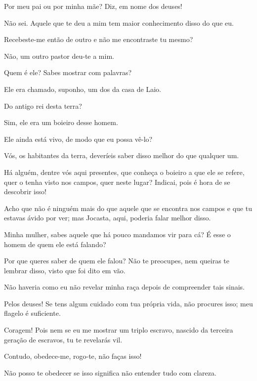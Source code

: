    Por meu pai ou por minha mãe? Diz, em nome dos deuses!

   Não sei. Aquele que te deu a mim tem maior conhecimento disso do que eu.

   Recebeste-me então de outro e não me encontraste tu mesmo?

   Não, um outro pastor deu-te a mim.

   Quem é ele? Sabes mostrar com palavras?

   Ele era chamado, suponho, um dos da casa de Laio.

   Do antigo rei desta terra?

   Sim, ele era um boieiro desse homem.

   Ele ainda está vivo, de modo que eu possa vê-lo?

   Vós, os habitantes da terra, deveríeis saber disso melhor do que
qualquer um.

   Há alguém, dentre vós aqui presentes, que conheça o boieiro a que ele se
refere, quer o tenha visto nos campos, quer neste lugar? Indicai,
pois é hora de se descobrir isso!

   Acho que não é ninguém mais do que aquele que se encontra nos campos e
que tu estavas ávido por ver; mas Jocasta, aqui, poderia falar melhor
disso.

   Minha mulher, sabes aquele que há pouco mandamos vir para cá? É esse o
homem de quem ele está falando?

   Por que queres saber de quem ele falou? Não te preocupes, nem queiras te
lembrar disso, visto que foi dito em vão.

   Não haveria como eu não revelar minha raça depois de compreender tais
sinais.

   Pelos deuses! Se tens algum cuidado com tua própria vida, não
procures isso; meu flagelo é suficiente.

   Coragem! Pois nem se eu me mostrar um triplo escravo, nascido da
terceira geração de escravos, tu te revelarás vil.

   Contudo, obedece-me, rogo-te, não faças isso!

   Não posso te obedecer se isso significa não entender tudo com clareza.

